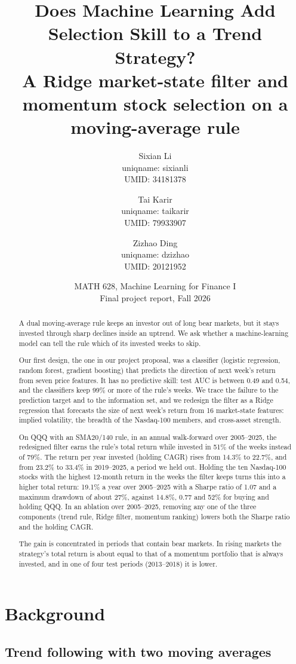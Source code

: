\documentclass[11pt]{article}
\title{Does Machine Learning Add Selection Skill to a Trend Strategy?\\[6pt]
\large A Ridge market-state filter and momentum stock selection on a moving-average rule}
\author{Sixian Li\\ {\normalsize uniqname: sixianli}\\ {\normalsize UMID: 34181378}
\and Tai Karir\\ {\normalsize uniqname: taikarir}\\ {\normalsize UMID: 79933907}
\and Zizhao Ding\\ {\normalsize uniqname: dzizhao}\\ {\normalsize UMID: 20121952}}
\date{MATH 628, Machine Learning for Finance I\\ Final project report, Fall 2026}
\begin{document}
\maketitle

\begin{abstract}
\noindent A dual moving-average rule keeps an investor out of long bear markets, but it stays invested through sharp declines inside an uptrend. We ask whether a machine-learning model can tell the rule which of its invested weeks to skip.

Our first design, the one in our project proposal, was a classifier (logistic regression, random forest, gradient boosting) that predicts the direction of next week's return from seven price features. It has no predictive skill: test AUC is between 0.49 and 0.54, and the classifiers keep 99\% or more of the rule's weeks. We trace the failure to the prediction target and to the information set, and we redesign the filter as a Ridge regression that forecasts the size of next week's return from 16 market-state features: implied volatility, the breadth of the Nasdaq-100 members, and cross-asset strength.

On QQQ with an SMA20/140 rule, in an annual walk-forward over 2005--2025, the redesigned filter earns the rule's total return while invested in 51\% of the weeks instead of 79\%. The return per year invested (holding CAGR) rises from 14.3\% to 22.7\%, and from 23.2\% to 33.4\% in 2019--2025, a period we held out. Holding the ten Nasdaq-100 stocks with the highest 12-month return in the weeks the filter keeps turns this into a higher total return: 19.1\% a year over 2005--2025 with a Sharpe ratio of 1.07 and a maximum drawdown of about 27\%, against 14.8\%, 0.77 and 52\% for buying and holding QQQ. In an ablation over 2005--2025, removing any one of the three components (trend rule, Ridge filter, momentum ranking) lowers both the Sharpe ratio and the holding CAGR.

The gain is concentrated in periods that contain bear markets. In rising markets the strategy's total return is about equal to that of a momentum portfolio that is always invested, and in one of four test periods (2013--2018) it is lower.
\end{abstract}

\section{Background}

\subsection{Trend following with two moving averages}
\end{document}
